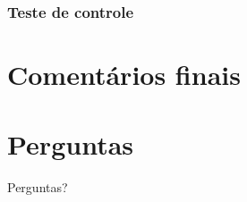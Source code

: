 \documentclass{beamer}
\begin{document}
\begin{frame}
	\frametitle{Teste de controle}
	\begin{center}
	\end{center}
\end{frame}
\section{Comentários finais}
\section{Perguntas}
\begin{frame}
\Huge{\centerline{Perguntas?}}
\end{frame}

\end{document}
